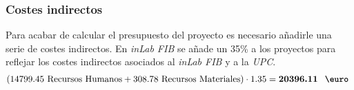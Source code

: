 \subsubsection{Costes indirectos}
Para acabar de calcular el presupuesto del proyecto es necesario añadirle una serie de costes indirectos. En \textit{inLab FIB} se añade un 35\% a los proyectos para reflejar los costes indirectos asociados al \textit{inLab FIB} y a la \textit{UPC}.
\begin{eqnarray} 
(14799.45 \mbox{ Recursos Humanos} + 308.78 \mbox{ Recursos Materiales}) \cdot 1.35 = \textbf{20396.11 \mbox{ \euro} }
\end{eqnarray}